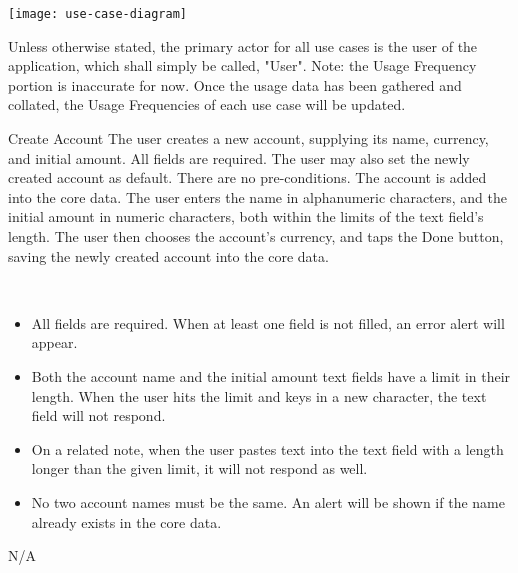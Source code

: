
\texttt{[image: use-case-diagram]}


Unless otherwise stated, the primary actor for all use cases is the user of the application, which shall simply be called, "User". Note: the Usage Frequency portion is inaccurate for now. Once the usage data has been gathered and collated, the Usage Frequencies of each use case will be updated.

	{Create Account}
    {The user creates a new account, supplying its name, currency, and initial amount. All fields are required. The user may also set the newly created account as default.}
    {There are no pre-conditions.} %
    {The account is added into the core data.}
    {The user enters the name in alphanumeric characters, and the initial amount in numeric characters, both within the limits of the text field's length. The user then chooses the account's currency, and taps the Done button, saving the newly created account into the core data.}
    {
    ~ 
    \begin{itemize}
		\item All fields are required. When at least one field is not filled, an error alert will appear.
        \item Both the account name and the initial amount text fields have a limit in their length. When the user hits the limit and keys in a new character, the text field will not respond.
        \item On a related note, when the user pastes text into the text field with a length longer than the given limit, it will not respond as well.
        \item No two account names must be the same. An alert will be shown if the name already exists in the core data.
    \end{itemize}    
    }
    {N/A}
    
